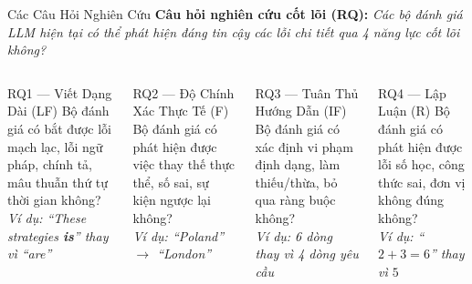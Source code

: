 \documentclass[aspectratio=169,10pt]{beamer}
\begin{document}
\begin{frame}{Các Câu Hỏi Nghiên Cứu}
  \textbf{Câu hỏi nghiên cứu cốt lõi (RQ):} \emph{Các bộ đánh giá LLM hiện tại có thể phát hiện đáng tin cậy các lỗi chi tiết qua 4 năng lực cốt lõi không?}

  \vspace{0.6em}
  \begin{columns}[T]
      \begin{block}{RQ1 — Viết Dạng Dài (LF)}
        Bộ đánh giá có bắt được lỗi mạch lạc, lỗi ngữ pháp, chính tả, mâu thuẫn thứ tự thời gian không?\\
        \small\textit{Ví dụ: ``These strategies \textbf{is}'' thay vì ``are''}
      \end{block}

      \vspace{0.4em}
      \begin{block}{RQ2 — Độ Chính Xác Thực Tế (F)}
        Bộ đánh giá có phát hiện được việc thay thế thực thể, số sai, sự kiện ngược lại không?\\
        \small\textit{Ví dụ: ``Poland'' $\to$ ``London''}
      \end{block}

      \begin{block}{RQ3 — Tuân Thủ Hướng Dẫn (IF)}
        Bộ đánh giá có xác định vi phạm định dạng, làm thiếu/thừa, bỏ qua ràng buộc không?\\
        \small\textit{Ví dụ: 6 dòng thay vì 4 dòng yêu cầu}
      \end{block}

      \vspace{0.4em}
      \begin{block}{RQ4 — Lập Luận (R)}
        Bộ đánh giá có phát hiện được lỗi số học, công thức sai, đơn vị không đúng không?\\
        \small\textit{Ví dụ: ``$2+3=6$'' thay vì $5$}
      \end{block}
  \end{columns}
\end{frame}
\end{document}
